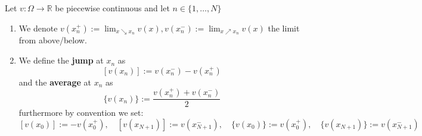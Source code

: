 \begin{definition}
	\label{def:jump_average}
	Let $v:\Omega \to \mathbb{R}$ be piecewise continuous and let $n \in
		\{1,\ldots,N\}$
	\begin{enumerate}[label=\textnormal{(\roman*)}]
		\item We denote $v(x_n^+) := \lim_{x \searrow x_n} v(x), v(x_n^-) := \lim_{x \nearrow x_n} v(x)$
		      the limit from above/below.
		\item We define the \textbf{jump} at $x_n$ as
		      \[
			      [v(x_n)]:= v(x_n^-) - v(x_n^+)
		      \]
		      and the \textbf{average} at $x_n$ as
		      \[
			      \{v(x_n)\}:= \frac{v(x_n^+) + v(x_n^-)}{2}
		      \]
		      furthermore by convention we set:
		      \[
			      [v(x_0)] := -v(x_0^+),\quad [v(x_{N+1})] := v(x_{N+1}^-),\quad
			      \{v(x_0)\}:=v(x_0^+),\quad \{v(x_{N+1})\}:= v(x_{N+1}^-)
		      \]
	\end{enumerate}
\end{definition}

